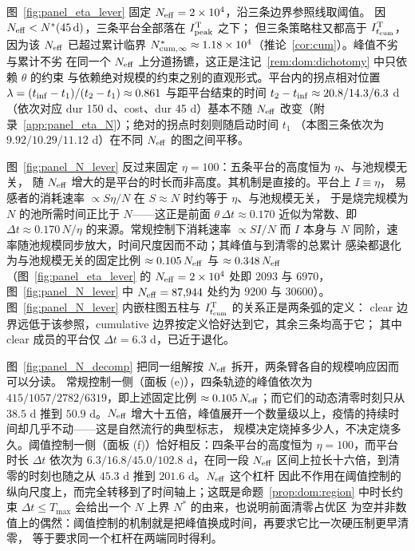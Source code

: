 \documentclass[lang=cn,a4paper,newtx]{elegantpaper}
\numberwithin{equation}{section}
\theoremstyle{plain}
\newcommand{\Itcum}{I_{t_{\mathrm{cum}}}}
\begin{document}
图~\ref{fig:panel_eta_lever} 固定 $N_{\rm eff}=2\times10^{4}$，沿三条边界参照线取阈值。
因 $N_{\rm eff}<N^\ast(45\,\mathrm d)$，三条平台全部落在 $I_{\rm peak}^{\rm T}$ 之下；
但三条策略柱又都高于 $\Itcum^{\rm T}$，因为该 $N_{\rm eff}$ 已超过累计临界
$N_{\rm cum,\infty}^\ast\approx1.18\times10^{4}$（推论~\ref{cor:cum}）。峰值不劣与累计不劣
在同一个 $N_{\rm eff}$ 上分道扬镳，这正是注记~\ref{rem:dom:dichotomy} 中只依赖 $\theta$ 的约束
与依赖绝对规模的约束之别的直观形式。平台内的拐点相对位置
$\lambda=(t_{\rm inf}-t_1)/(t_2-t_1)\approx0.861$ 与距平台结束的时间
$t_2-t_{\rm inf}\approx20.8/14.3/6.3$ d（依次对应 dur 150 d、cost、dur 45 d）基本不随
$N_{\rm eff}$ 改变（附录~\ref{app:panel_eta_N}）；绝对的拐点时刻则随启动时间 $t_1$
（本图三条依次为 $9.92/10.29/11.12$ d）在不同 $N_{\rm eff}$ 的图之间平移。

图~\ref{fig:panel_N_lever} 反过来固定 $\eta=100$：五条平台的高度恒为 $\eta$、与池规模无关，
随 $N_{\rm eff}$ 增大的是平台的时长而非高度。其机制是直接的。平台上 $I\equiv\eta$，
易感者的消耗速率 $\propto S\eta/N$ 在 $S\approx N$ 时约等于 $\eta$、与池规模无关，
于是烧完规模为 $N$ 的池所需时间正比于 $N$——这正是前面 $\theta\,\Delta t\approx0.170$
近似为常数、即 $\Delta t\approx0.170\,N/\eta$ 的来源。常规控制下消耗速率 $\propto SI/N$
而 $I$ 本身与 $N$ 同阶，速率随池规模同步放大，时间尺度因而不动；其峰值与到清零的总累计
感染都退化为与池规模无关的固定比例 $\approx0.105\,N_{\rm eff}$ 与 $\approx0.348\,N_{\rm eff}$
（图~\ref{fig:panel_eta_lever} 的 $N_{\rm eff}=2\times10^4$ 处即 $2093$ 与 $6970$，
图~\ref{fig:panel_N_lever} 中 $N_{\rm eff}=87{,}944$ 处约为 $9200$ 与 $30600$）。
图~\ref{fig:panel_N_lever} 内嵌柱图五柱与 $\Itcum^{\rm T}$ 的关系正是两条弧的定义：
clear 边界远低于该参照，cumulative 边界按定义恰好达到它，其余三条均高于它；
其中 clear 成员的平台仅 $\Delta t=6.3$ d，已近于退化。

图~\ref{fig:panel_N_decomp} 把同一组解按 $N_{\rm eff}$ 拆开，两条臂各自的规模响应因而可以分读。
常规控制一侧（面板 (e)），四条轨迹的峰值依次为 $415/1057/2782/6319$，即上述固定比例
$\approx0.105\,N_{\rm eff}$；而它们的动态清零时刻只从 $38.5$ d 推到 $50.9$ d。$N_{\rm eff}$
增大十五倍，峰值展开一个数量级以上，疫情的持续时间却几乎不动——这是自然流行的典型标志，
规模决定烧掉多少人，不决定烧多久。阈值控制一侧（面板 (f)）恰好相反：四条平台的高度恒为
$\eta=100$，而平台时长 $\Delta t$ 依次为 $6.3/16.8/45.0/102.8$ d，在同一段 $N_{\rm eff}$
区间上拉长十六倍，到清零的时刻也随之从 $45.3$ d 推到 $201.6$ d。$N_{\rm eff}$ 这个杠杆
因此不作用在阈值控制的纵向尺度上，而完全转移到了时间轴上；这既是命题~\ref{prop:dom:region}
中时长约束 $\Delta t\le T_{\max}$ 会给出一个 $N$ 上界 $N^\ast$ 的由来，也说明前面清零占优区
为空并非数值上的偶然：阈值控制的机制就是把峰值换成时间，再要求它比一次硬压制更早清零，
等于要求同一个杠杆在两端同时得利。
\end{document}

